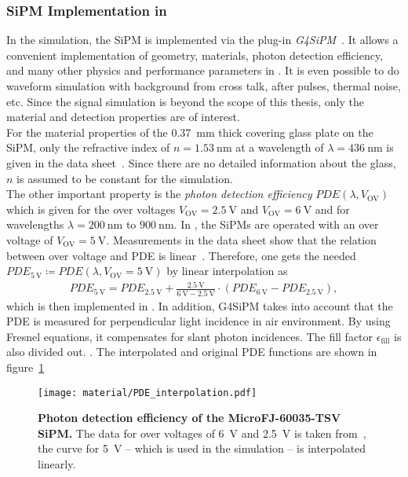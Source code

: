 \subsubsection{SiPM Implementation in \geant}

In the \iceact \geant simulation, the SiPM is implemented via the plug-in \textit{G4SiPM}~\cite{sipm:g4sipm}. It allows a convenient implementation of geometry, materials, photon detection efficiency, and many other physics and performance parameters in \geant. It is even possible to do waveform simulation with background from cross talk, after pulses, thermal noise, etc. Since the signal simulation is beyond the scope of this thesis, only the material and detection properties are of interest.\\

For the material properties of the \SI{0.37}{\milli\meter} thick covering glass plate on the SiPM, only the refractive index of $n = \SI{1.53}{\nano\meter}$ at a wavelength of $\lambda = \SI{436}{\nano\meter}$ is given in the data sheet~\cite{sipm:datasheet}. Since there are no detailed information about the glass, $n$ is assumed to be constant for the simulation.\\

The other important property is the \textit{photon detection efficiency} $PDE(\lambda,V_\text{OV})$ which is given for the over voltages $V_\text{OV}=\SI{2.5}{\volt}$ and $V_\text{OV}=\SI{6}{\volt}$ and for wavelengths $\lambda = \SI{200}{\nano\meter}$ to $\SI{900}{\nano\meter}$. In \iceact, the SiPMs are operated with an over voltage of $V_\text{OV} = \SI{5}{\volt}$. Measurements in the data sheet show that the relation between over voltage and PDE is linear~\cite{sipm:datasheet}. Therefore, one gets the needed $PDE_{\SI{5}{\volt}}\coloneqq PDE(\lambda,V_\text{OV}=\SI{5}{\volt})$ by linear interpolation as
\begin{align}
	PDE_{\SI{5}{\volt}} = PDE_{\SI{2.5}{\volt}} + \frac{\SI{2.5}{\volt}}{\SI{6}{\volt}-\SI{2.5}{\volt}} \cdot (PDE_{\SI{6}{\volt}}-PDE_{\SI{2.5}{\volt}}),
\end{align}
which is then implemented in \geant. In addition, G4SiPM takes into account that the PDE is measured for perpendicular light incidence in air environment. By using Fresnel equations, it compensates for slant photon incidences. The fill factor $\epsilon_\text{fill}$ is also divided out. \cite{sipm:g4sipm,famous:niggemann}. 
The interpolated and original PDE functions are shown in figure~\ref{sipm:pde}\\

\begin{figure}[H]
	\centering
	\texttt{[image: material/PDE\_interpolation.pdf]}
	\caption[Photon detection efficiency of the \iceact SiPM]{\textbf{Photon detection efficiency of the MicroFJ-60035-TSV SiPM.} The data for over voltages of \SI{6}{\volt} and \SI{2.5}{\volt} is taken from~\cite{sipm:datasheet}, the curve for \SI{5}{\volt} -- which is used in the \geant simulation -- is interpolated linearly.}
	\label{sipm:pde}	
\end{figure}
